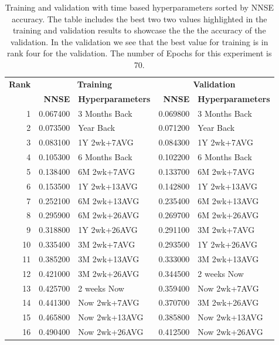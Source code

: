 \documentclass[utf8]{FrontiersinVancouver} %
\begin{document}
\begin{table}[htb]

  \caption{Training and validation with time based hyperparameters
    sorted by NNSE accuracy. The table includes the best two two
    values highlighted in the training and validation results to
    showcase the the the accuracy of the validation. In the validation
    we see that the best value for training is in rank four for the
    validation. The number of Epochs for this experiment is 70.}
  \label{tab:training-70}

  \renewcommand{\arraystretch}{1.2}    
\begin{center}
\begin{tabular}{|r|rl||rl|}
  \hline
{\bf Rank} & \multicolumn{2}{c||}{\bfseries Training} & \multicolumn{2}{c|}{\bfseries Validation} \\
     &   {\bf NNSE} & {\bf Hyperparameters} & {\bf NNSE} & {\bf Hyperparameters} \\
              \hline
 1 & \color{red} 0.067400 & \color{red} 3 Months Back & \color{red}0.069800 & \color{red} 3 Months Back \\
 2 & \color{blue} 0.073500 & \color{blue} Year Back & \color{blue} 0.071200 & \color{blue} Year Back \\
 3 & 0.083100 & 1Y 2wk+7AVG & 0.084300 & 1Y 2wk+7AVG \\
 4 & 0.105300 & 6 Months Back & 0.102200 & 6 Months Back \\
 5 & 0.138400 & 6M 2wk+7AVG & 0.133700 & 6M 2wk+7AVG \\
 6 & 0.153500 & 1Y 2wk+13AVG & 0.142800 & 1Y 2wk+13AVG \\
 7 & 0.252100 & 6M 2wk+13AVG & 0.235400 & 6M 2wk+13AVG \\
 8 & 0.295900 & 6M 2wk+26AVG & 0.269700 & 6M 2wk+26AVG \\
 9 & 0.318800 & 1Y 2wk+26AVG & 0.291100 & 3M 2wk+7AVG \\
10 & 0.335400 & 3M 2wk+7AVG & 0.293500 & 1Y 2wk+26AVG \\
11 & 0.385200 & 3M 2wk+13AVG & 0.333000 & 3M 2wk+13AVG \\
12 & 0.421000 & 3M 2wk+26AVG & 0.344500 & 2 weeks Now \\
13 & 0.425700 & 2 weeks Now & 0.359400 & Now 2wk+7AVG \\
14 & 0.441300 & Now 2wk+7AVG & 0.370700 & 3M 2wk+26AVG \\
15 & 0.465800 & Now 2wk+13AVG & 0.385800 & Now 2wk+13AVG \\
16 & 0.490400 & Now 2wk+26AVG & 0.412500 & Now 2wk+26AVG \\
\hline
\end{tabular}
\end{center}

\end{table}
\end{document}
